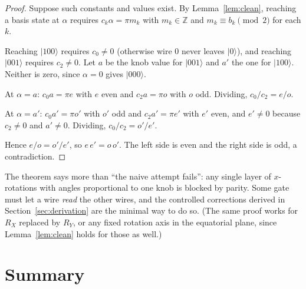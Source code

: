 \documentclass[11pt,a4paper]{article}
\newcommand{\ket}[1]{\lvert #1 \rangle}
\newcommand{\RX}{R_X}
\newcommand{\RY}{R_Y}
\newcommand{\Z}{\mathbb{Z}}
\theoremstyle{plain}
\theoremstyle{definition}
\theoremstyle{remark}
\begin{document}
\begin{proof}
Suppose such constants and values exist. By Lemma~\ref{lem:clean}, reaching a basis state at
$\alpha$ requires $c_k\alpha = \pi m_k$ with $m_k\in\Z$ and $m_k \equiv b_k \pmod 2$ for each $k$.

Reaching $\ket{100}$ requires $c_0 \neq 0$ (otherwise wire 0 never leaves $\ket{0}$), and
reaching $\ket{001}$ requires $c_2\neq0$. Let $a$ be the knob value for $\ket{001}$ and $a'$ the
one for $\ket{100}$. Neither is zero, since $\alpha = 0$ gives $\ket{000}$.

At $\alpha = a$: $c_0 a = \pi e$ with $e$ even and $c_2 a = \pi o$ with $o$ odd. Dividing,
$c_0/c_2 = e/o$.

At $\alpha = a'$: $c_0 a' = \pi o'$ with $o'$ odd and $c_2 a' = \pi e'$ with $e'$ even, and
$e'\neq0$ because $c_2\neq0$ and $a'\neq0$. Dividing, $c_0/c_2 = o'/e'$.

Hence $e/o = o'/e'$, so $e\,e' = o\,o'$. The left side is even and the right side is odd, a
contradiction.
\end{proof}

The theorem says more than ``the naive attempt fails'': any single layer of $x$-rotations with
angles proportional to one knob is blocked by parity. Some gate must let a wire \emph{read} the
other wires, and the controlled corrections derived in Section~\ref{sec:derivation} are the
minimal way to do so. (The same proof works for $\RX$ replaced by $\RY$, or any fixed rotation
axis in the equatorial plane, since Lemma~\ref{lem:clean} holds for those as well.)

\section{Summary}
\end{document}
